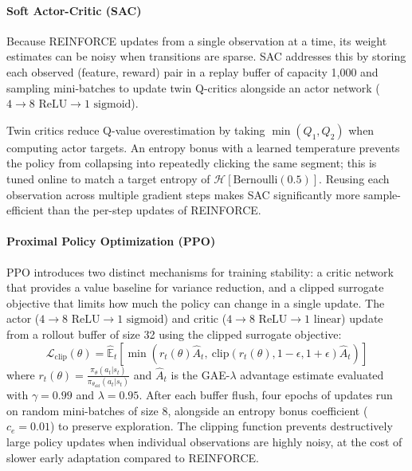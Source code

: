 \documentclass{article}
\begin{document}
\paragraph{Soft Actor-Critic (SAC)} 
Because REINFORCE updates from a single observation at a time, its weight estimates can be noisy when transitions are sparse. SAC addresses this by storing each observed (feature, reward) pair in a replay buffer of capacity 1,000 and sampling mini-batches to update twin Q-critics alongside an actor network ($4 \rightarrow 8 \text{ ReLU} \rightarrow 1 \text{ sigmoid}$). 

Twin critics reduce Q-value overestimation by taking $\min(Q_1, Q_2)$ when computing actor targets. An entropy bonus with a learned temperature prevents the policy from collapsing into repeatedly clicking the same segment; this is tuned online to match a target entropy of $\mathcal{H}[\text{Bernoulli}(0.5)]$. Reusing each observation across multiple gradient steps makes SAC significantly more sample-efficient than the per-step updates of REINFORCE.

\paragraph{Proximal Policy Optimization (PPO)} 
PPO introduces two distinct mechanisms for training stability: a critic network that provides a value baseline for variance reduction, and a clipped surrogate objective that limits how much the policy can change in a single update. The actor ($4 \rightarrow 8 \text{ ReLU} \rightarrow 1 \text{ sigmoid}$) and critic ($4 \rightarrow 8 \text{ ReLU} \rightarrow 1 \text{ linear}$) update from a rollout buffer of size 32 using the clipped surrogate objective:
\begin{equation}
\mathcal{L}_{\text{clip}}(\theta) = \hat{\mathbb{E}}_t\left[\min\left(r_t(\theta)\hat{A}_t,\ \text{clip}(r_t(\theta), 1-\epsilon, 1+\epsilon)\hat{A}_t\right)\right]
\end{equation}
where $r_t(\theta) = \frac{\pi_\theta(a_t|s_t)}{\pi_{\theta_{\text{old}}}(a_t|s_t)}$ and $\hat{A}_t$ is the GAE-$\lambda$ advantage estimate evaluated with $\gamma = 0.99$ and $\lambda = 0.95$. After each buffer flush, four epochs of updates run on random mini-batches of size 8, alongside an entropy bonus coefficient ($c_e = 0.01$) to preserve exploration. The clipping function prevents destructively large policy updates when individual observations are highly noisy, at the cost of slower early adaptation compared to REINFORCE.
\end{document}
